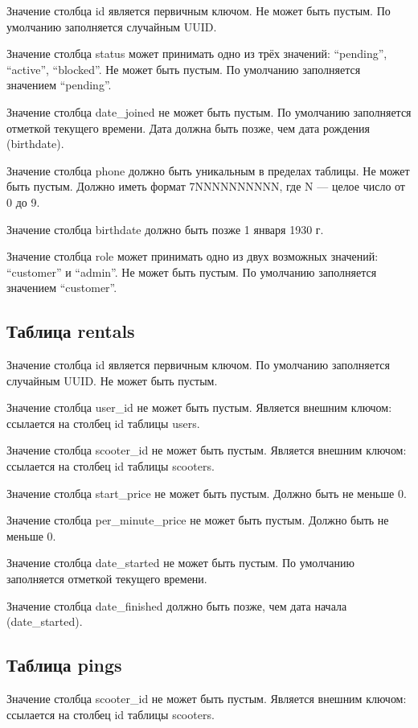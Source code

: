 Значение столбца id является первичным ключом. Не может быть пустым. По умолчанию заполняется случайным UUID.

Значение столбца status может принимать одно из трёх значений: \enquote{pending}, \enquote{active}, \enquote{blocked}. Не может быть пустым. По умолчанию заполняется значением \enquote{pending}.

Значение столбца date\_joined не может быть пустым. По умолчанию заполняется отметкой текущего времени. Дата должна быть позже, чем дата рождения (birthdate).

Значение столбца phone должно быть уникальным в пределах таблицы. Не может быть пустым. Должно иметь формат 7NNNNNNNNNN, где N --- целое число от 0 до 9.

Значение столбца birthdate должно быть позже 1 января 1930 г.

Значение столбца role может принимать одно из двух возможных значений: \enquote{customer} и \enquote{admin}. Не может быть пустым. По умолчанию заполняется значением \enquote{customer}.

\subsection{Таблица rentals}

Значение столбца id является первичным ключом. По умолчанию заполняется случайным UUID. Не может быть пустым.

Значение столбца user\_id не может быть пустым. Является внешним ключом: ссылается на столбец id таблицы users.

Значение столбца scooter\_id не может быть пустым. Является внешним ключом: ссылается на столбец id таблицы scooters.

Значение столбца start\_price не может быть пустым. Должно быть не меньше 0.

Значение столбца per\_minute\_price не может быть пустым. Должно быть не меньше 0.

Значение столбца date\_started не может быть пустым. По умолчанию заполняется отметкой текущего времени.

Значение столбца date\_finished должно быть позже, чем дата начала (date\_started).

\subsection{Таблица pings}

Значение столбца scooter\_id не может быть пустым. Является внешним ключом: ссылается на столбец id таблицы scooters.


